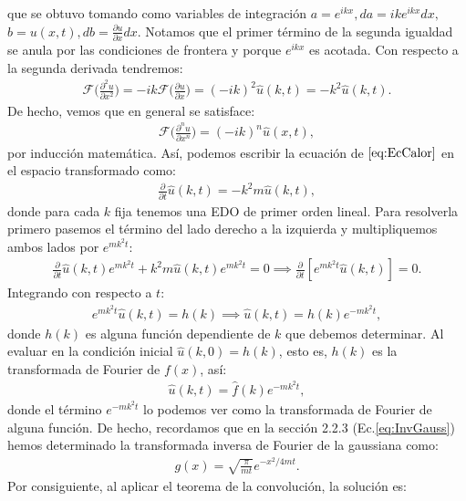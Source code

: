 \documentclass[12pt]{article}
\theoremstyle{definition}
\begin{document}
que se obtuvo tomando como variables de integración $a = e^{ikx}, da = ike^{ikx}dx,$ \\  $b = u(x,t), db = \frac{\partial u}{\partial x}dx$. Notamos que el primer término de la segunda igualdad se anula por las condiciones de frontera y porque $e^{ikx}$ es acotada. Con respecto a la segunda derivada tendremos:
\begin{align*}
    \mathcal{F}\bigg(\frac{\partial ^2u}{\partial x^2}\bigg) = -ik \mathcal{F}\bigg(\frac{\partial u}{\partial x}\bigg) = (-ik)^2\hat{u}(k,t) = -k^2\hat{u}(k,t).
\end{align*}
De hecho, vemos que en general se satisface:
\begin{align}
    \mathcal{F}\bigg(\frac{\partial^nu}{\partial x^n}\bigg) =
    (-ik)^n\hat{u}(x,t),
    \label{eq:GeneralTransformada}
\end{align}
por inducción matemática. Así, podemos escribir la ecuación de $\eqref{eq:EcCalor}$ en el espacio transformado como:
\begin{align*}
    \frac{\partial}{\partial t}\hat{u}(k,t) = -k^2m\hat{u}(k,t),
\end{align*}
donde para cada $k$ fija tenemos una EDO de primer orden lineal. Para resolverla primero pasemos el término del lado derecho a la izquierda y multipliquemos ambos lados por $e^{mk^2t}$:
\begin{align*}
    \frac{\partial}{\partial t}\hat{u}(k,t)e^{mk^2t} + k^2m\hat{u}(k,t)e^{mk^2t} = 0
    \implies
    \frac{\partial}{\partial t}[e^{mk^2t}\hat{u}(k,t)] = 0.
\end{align*}
Integrando con respecto a $t$:
\begin{align*}
    e^{mk^2t}\hat{u}(k,t) = h(k) 
    \implies
    \hat{u}(k,t) = h(k)e^{-mk^2t},
\end{align*}
donde $h(k)$ es alguna función dependiente de $k$ que debemos determinar. Al evaluar en la condición inicial $\hat{u}(k,0) = h(k)$, esto es, $h(k)$ es la transformada de Fourier de $f(x)$, así:
\begin{align*}
    \hat{u}(k,t) = \hat{f}(k)e^{-mk^2t},
\end{align*}
donde el término $e^{-mk^2t}$ lo podemos ver como la transformada de Fourier de alguna función. De hecho, recordamos que en la sección 2.2.3 (Ec.\eqref{eq:InvGauss}) hemos determinado la transformada inversa de Fourier de la gaussiana como:
\begin{align*}
    g(x) = \sqrt{\frac{\pi}{mt}}e^{-x^2 / 4mt}.
\end{align*}
Por consiguiente, al aplicar el teorema de la convolución, la solución es:
\end{document}
